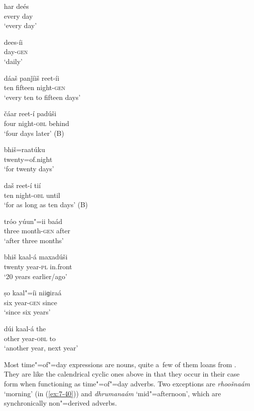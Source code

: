\begin{exe}
\ex
\label{ex:7-30}
\gll har deés  \\
every day \\
\glt `every day' 

\ex
\label{ex:7-31}
\gll dees-íi \\
day-\textsc{gen} \\
\glt `daily' 

\ex
\label{ex:7-32}
\gll dáaš panǰíiš reet-íi \\
ten fifteen night-\textsc{gen} \\
\glt `every ten to fifteen days'

\ex
\label{ex:7-33}
\gll čáar reet-í padúši \\
four night-\textsc{obl} behind  \\
\glt `four days later' (B)

\ex
\label{ex:7-34}
\gll bhiš=raatúku\\
twenty=of.night    \\
\glt `for twenty days'

\ex
\label{ex:7-35}
\gll daš reet-í tií \\
ten night-\textsc{obl} until  \\
\glt `for as long as ten days' (B)

\ex
\label{ex:7-36}
\gll tróo yúun"=ii baád \\
three month-\textsc{gen} after \\
\glt `after three months'

\ex
\label{ex:7-37}
\gll bhiš kaal-á maxadúši \\
twenty year-\textsc{pl} in.front  \\
\glt `20 years earlier/ago'

\ex
\label{ex:7-38}
\gll ṣo kaal"=íi niiɡiraá \\
six year-\textsc{gen} since  \\
\glt `since six years'

\ex
\label{ex:7-39}
\gll dúi kaal-á the \\
other year-\textsc{obl} to \\
\glt `another year, next year'
\end{exe}

Most time"=of"=day expressions are nouns, quite a~few of them loans from \iliPashto. They are like the
calendrical cyclic ones above in that they occur in their  case form when functioning as
time"=of"=day adverbs. Two exceptions are \textit{rhoošnaám} `morning' (in (\ref{ex:7-40})) and
\textit{dhrumanaám} `mid"=afternoon', which are synchronically non"=derived adverbs.

